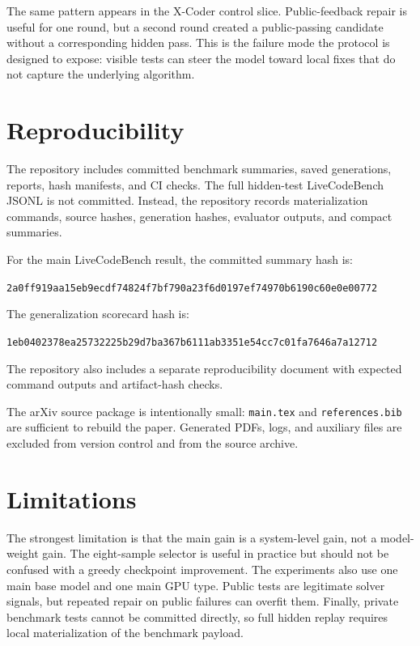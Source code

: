 \documentclass[11pt]{article}
\begin{document}
The same pattern appears in the X-Coder control slice. Public-feedback repair
is useful for one round, but a second round created a public-passing candidate
without a corresponding hidden pass. This is the failure mode the protocol is
designed to expose: visible tests can steer the model toward local fixes that
do not capture the underlying algorithm.

\section{Reproducibility}

The repository includes committed benchmark summaries, saved generations,
reports, hash manifests, and CI checks. The full hidden-test LiveCodeBench JSONL
is not committed. Instead, the repository records materialization commands,
source hashes, generation hashes, evaluator outputs, and compact summaries.

For the main LiveCodeBench result, the committed summary hash is:

\begin{center}
\small
\texttt{2a0ff919aa15eb9ecdf74824f7bf790a23f6d0197ef74970b6190c60e0e00772}
\end{center}

The generalization scorecard hash is:

\begin{center}
\small
\texttt{1eb0402378ea25732225b29d7ba367b6111ab3351e54cc7c01fa7646a7a12712}
\end{center}

The repository also includes a separate reproducibility document with expected
command outputs and artifact-hash checks.

The arXiv source package is intentionally small: \texttt{main.tex} and
\texttt{references.bib} are sufficient to rebuild the paper. Generated PDFs,
logs, and auxiliary files are excluded from version control and from the source
archive.

\section{Limitations}

The strongest limitation is that the main gain is a system-level gain, not a
model-weight gain. The eight-sample selector is useful in practice but should
not be confused with a greedy checkpoint improvement. The experiments also use
one main base model and one main GPU type. Public tests are legitimate solver
signals, but repeated repair on public failures can overfit them. Finally,
private benchmark tests cannot be committed directly, so full hidden replay
requires local materialization of the benchmark payload.
\end{document}
